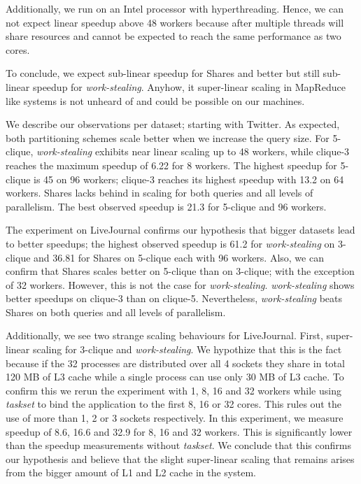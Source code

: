 Additionally, we run on an Intel processor with hyperthreading.
Hence, we can not expect linear speedup above 48 workers because after multiple threads will share resources and cannot be
expected to reach the same performance as two cores.

To conclude, we expect sub-linear speedup for Shares and better but still sub-linear speedup for \textit{work-stealing}.
Anyhow, it super-linear scaling in MapReduce like systems is not unheard of and could be possible on our machines.

We describe our observations per dataset;
starting with Twitter.
As expected, both partitioning schemes scale better when we increase the query size.
For 5-clique, \textit{work-stealing} exhibits near linear scaling up to 48 workers, while
clique-3 reaches the maximum speedup of 6.22 for 8 workers.
The highest speedup for 5-clique is 45 on 96 workers; clique-3 reaches its highest speedup
with 13.2 on 64 workers.
Shares lacks behind in scaling for both queries and all levels of parallelism.
The best observed speedup is 21.3 for 5-clique and 96 workers.

The experiment on LiveJournal confirms our hypothesis that bigger datasets lead to better
speedups;
the highest observed speedup is 61.2 for \textit{work-stealing} on 3-clique and
36.81 for Shares on 5-clique each with 96 workers.
Also, we can confirm that Shares scales better on 5-clique than on 3-clique; with the exception of 32 workers.
However, this is not the case for \textit{work-stealing}.
\textit{work-stealing} shows better speedups on clique-3 than on clique-5.
Nevertheless, \textit{work-stealing} beats Shares on both queries and all levels of parallelism.

Additionally, we see two strange scaling behaviours for LiveJournal.
First, super-linear scaling for 3-clique and \textit{work-stealing}.
We hypothize that this is the fact because if the 32 processes are distributed over all 4 sockets they share in total
120 MB of L3 cache while a single process can use only 30 MB of L3 cache.
To confirm this we rerun the experiment with 1, 8, 16 and 32 workers while using \textit{taskset} to bind the application
to the first 8, 16 or 32 cores.
This rules out the use of more than 1, 2 or 3 sockets respectively.
In this experiment, we measure speedup of 8.6, 16.6 and 32.9 for 8, 16 and 32 workers.
This is significantly lower than the speedup measurements without \textit{taskset}.
We conclude that this confirms our hypothesis and believe that the slight super-linear
scaling that remains arises from the bigger amount of L1 and L2 cache in the system.

